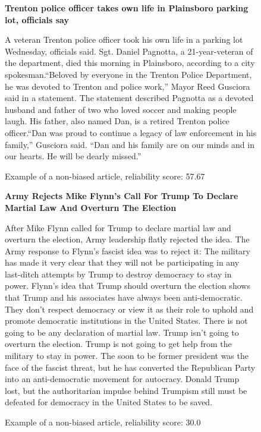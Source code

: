 \begin{figure}[htbp]
    \centering
    \begin{minipage}{1\linewidth}
        \begin{center}
            \small{\textbf{Trenton police officer takes own life in Plainsboro parking lot, officials say}}
        \end{center}
        \scriptsize{
            A veteran Trenton police officer took his own life in a parking lot Wednesday, officials said. Sgt. Daniel Pagnotta, a 21-year-veteran of the department, died this morning in Plainsboro, according to a city spokesman.“Beloved by everyone in the Trenton Police Department, he was devoted to Trenton and police work,” Mayor Reed Gusciora said in a statement. The statement described Pagnotta as a devoted husband and father of two who loved soccer and making people laugh. His father, also named Dan, is a retired Trenton police officer.“Dan was proud to continue a legacy of law enforcement in his family,” Gusciora said. “Dan and his family are on our minds and in our hearts. He will be dearly missed.”}
    \end{minipage}
    \caption{Example of a non-biased article, reliability score: 57.67}
    \label{fig:example-nonbiased-article-1}
\end{figure}

\begin{figure}[htbp]
    \centering
    \begin{minipage}{1\linewidth}
        \begin{center}
            \small{\textbf{Army Rejects Mike Flynn’s Call For Trump To Declare Martial Law And Overturn The Election}}
        \end{center}
        \scriptsize{
            After Mike Flynn called for Trump to declare martial law and overturn the election, Army leadership flatly rejected the idea. The Army response to Flynn’s fascist idea was to reject it: The military has made it very clear that they will not be participating in any last-ditch attempts by Trump to destroy democracy to stay in power. Flynn’s idea that Trump should overturn the election shows that Trump and his associates have always been anti-democratic. They don’t respect democracy or view it as their role to uphold and promote democratic institutions in the United States. There is not going to be any declaration of martial law. Trump isn’t going to overturn the election. Trump is not going to get help from the military to stay in power. The soon to be former president was the face of the fascist threat, but he has converted the Republican Party into an anti-democratic movement for autocracy. Donald Trump lost, but the authoritarian impulse behind Trumpism still must be defeated for democracy in the United States to be saved.}
    \end{minipage}
    \caption{Example of a non-biased article, reliability score: 30.0}
    \label{fig:example-mixed-biased-article-1}
\end{figure}

